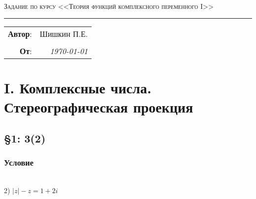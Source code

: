 \documentclass{article}
\begin{document}
\setlength{\abovedisplayskip}{3pt}
\setlength{\abovedisplayshortskip}{3pt}
\setlength{\belowdisplayskip}{3pt}
\setlength{\belowdisplayshortskip}{3pt}


\begin{center}
    \LARGE \textsc{Задание по курсу <<Теория функций комплексного переменного I>>}
\end{center}

\hrule

\phantom{42}

\begin{flushright}
    \begin{tabular}{rr}
        \textbf{Автор}: 
        & Шишкин П.Е. \\ 
        &\\
        \textbf{От}: &
        \textit{\today}\\
    \end{tabular}
\end{flushright}

\thispagestyle{empty}
\tableofcontents 

\newpage
\section{I. Комплексные числа. Стереографическая проекция}

\subsection{\S1: 3(2)}
\subsubsection*{Условие}
\\
2) $|z|-z=1+2 i$
\end{document}
